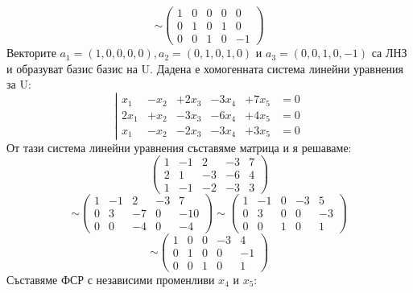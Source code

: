 \documentclass{article}
\begin{document}
\begin{equation}
    \label{matrixU}
    \sim\left(
    \begin{array}{ccccc}
            1 & 0 & 0 & 0 & 0  \\
            0 & 1 & 0 & 1 & 0  \\
            0 & 0 & 1 & 0 & -1
        \end{array}
    \right)
\end{equation}
Векторите $a_1 = (1,0,0,0,0), a_2 = (0,1,0,1,0)$ и $a_3=(0,0,1,0,-1)$ са ЛНЗ и образуват базис базис на U.
\newpage
Дадена е хомогенната система линейни уравнения за U:
\[
    \left| \begin{array}{cccccc}
        x_1   & - x_2 & + 2 x _3 & - 3 x_4 & + 7 x_5 & =0 \\
        2 x_1 & + x_2 & - 3 x_3  & - 6 x_4 & + 4 x_5 & =0 \\
        x_1   & - x_2 & - 2 x_3  & - 3 x_4 & + 3 x_5 & =0
    \end{array}
    \right.
\]
От тази система линейни уравнения съставяме матрица и я решаваме:
\[
    \left( \begin{array}{ccccc}
            1 & -1 & 2  & -3 & 7 \\
            2 & 1  & -3 & -6 & 4 \\
            1 & -1 & -2 & -3 & 3
        \end{array}
    \right)
\]
\[
    \sim\left(\begin{array}{ccccc}
            1 & -1 & 2  & -3 & 7   \\
            0 & 3  & -7 & 0  & -10 \\
            0 & 0  & -4 & 0  & -4
        \end{array}
    \right)
    \sim\left(\begin{array}{ccccc}
            1 & -1 & 0 & -3 & 5  \\
            0 & 3  & 0 & 0  & -3 \\
            0 & 0  & 1 & 0  & 1
        \end{array}
    \right)
\]
\begin{equation}\label{oprostenaSistemaW}
    \sim\left(\begin{array}{ccccc}
            1 & 0 & 0 & -3 & 4  \\
            0 & 1 & 0 & 0  & -1 \\
            0 & 0 & 1 & 0  & 1
        \end{array}
    \right)
\end{equation}
Съставяме ФСР с независими променливи $x_4$ и $x_5$:
\end{document}
